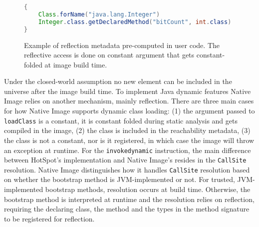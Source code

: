 \begin{figure}[ht]
    \centering
\begin{lstlisting}[language=Java]
{
    Class.forName("java.lang.Integer")
    Integer.class.getDeclaredMethod("bitCount", int.class)
}    
\end{lstlisting}
    \caption{Example of reflection metadata pre-computed in user code. The reflective access is done on constant argument that gets constant-folded at image build time.}
    \label{fig:computing_reflection_metadata_in_code_code}
\end{figure}

Under the closed-world assumption no new element can be included in the universe after the image build time. To implement Java dynamic features Native Image relies on another mechanism, mainly reflection. 
There are three main cases for how Native Image supports dynamic class loading: (1) the argument passed to \verb|loadClass| is a constant, it is constant folded during static analysis and gets compiled in the image, (2) the class is included in the reachability metadata, (3) the class is not a constant, nor is it registered, in which case the image will throw an exception at runtime.
For the \verb|invokedynamic| instruction, the main difference between HotSpot's implementation and Native Image's resides in the \verb|CallSite| resolution. Native Image distinguishes how it handles \verb|CallSite| resolution based on whether the bootstrap method is JVM-implemented or not. For trusted, JVM-implemented bootstrap methods, resolution occurs at build time. Otherwise, the bootstrap method is interpreted at runtime and the resolution relies on reflection, requiring the declaring class, the method and the types in the method signature to be registered for reflection.